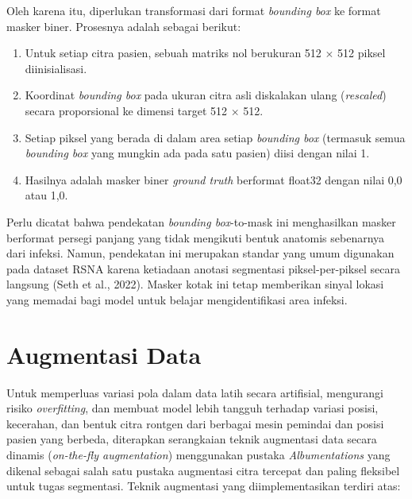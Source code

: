 \documentclass[12pt,a4paper,oneside]{book}
\begin{document}
Oleh karena itu, diperlukan transformasi dari format \textit{bounding box} ke format masker biner. Prosesnya adalah sebagai berikut:
\begin{enumerate}
  \item Untuk setiap citra pasien, sebuah matriks nol berukuran 512 $\times$ 512 piksel diinisialisasi.
  \item Koordinat \textit{bounding box} pada ukuran citra asli diskalakan ulang (\textit{rescaled}) secara proporsional ke dimensi target 512 $\times$ 512.
  \item Setiap piksel yang berada di dalam area setiap \textit{bounding box} (termasuk semua \textit{bounding box} yang mungkin ada pada satu pasien) diisi dengan nilai 1.
  \item Hasilnya adalah masker biner \textit{ground truth} berformat float32 dengan nilai 0,0 atau 1,0.
\end{enumerate}

Perlu dicatat bahwa pendekatan \textit{bounding box}-to-mask ini menghasilkan masker berformat persegi panjang yang tidak mengikuti bentuk anatomis sebenarnya dari infeksi. Namun, pendekatan ini merupakan standar yang umum digunakan pada dataset RSNA karena ketiadaan anotasi segmentasi piksel-per-piksel secara langsung (Seth et al., 2022). Masker kotak ini tetap memberikan sinyal lokasi yang memadai bagi model untuk belajar mengidentifikasi area infeksi.

\section{Augmentasi Data}

Untuk memperluas variasi pola dalam data latih secara artifisial, mengurangi risiko \textit{overfitting}, dan membuat model lebih tangguh terhadap variasi posisi, kecerahan, dan bentuk citra rontgen dari berbagai mesin pemindai dan posisi pasien yang berbeda, diterapkan serangkaian teknik augmentasi data secara dinamis (\textit{on-the-fly augmentation}) menggunakan pustaka \textit{Albumentations} yang dikenal sebagai salah satu pustaka augmentasi citra tercepat dan paling fleksibel untuk tugas segmentasi. Teknik augmentasi yang diimplementasikan terdiri atas:
\end{document}
